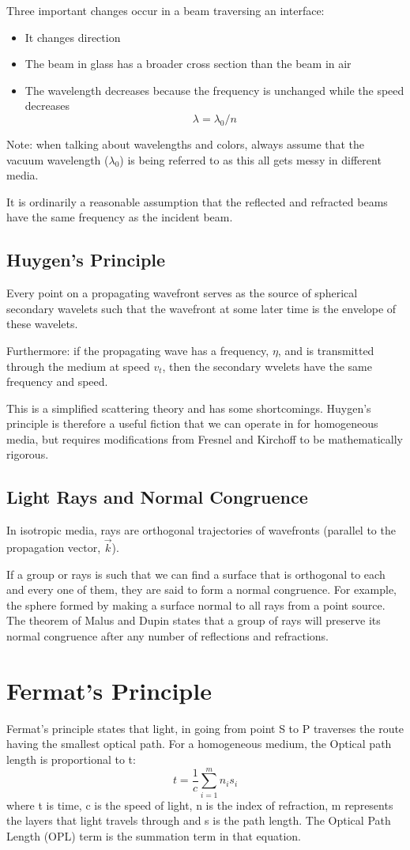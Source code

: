 \documentclass[12pt]{report}
\begin{document}
Three important changes occur in a beam traversing an interface:
\begin{itemize}
\item It changes direction
\item The beam in glass has a broader cross section than the beam in air
\item The wavelength decreases because the frequency is unchanged while the speed decreases \[\lambda = \lambda_0/n\]
\end{itemize}
Note: when talking about wavelengths and colors, always assume that the vacuum wavelength ($\lambda_0$) is being referred to as this all gets messy in different media. 

It is ordinarily a reasonable assumption that the reflected and refracted beams have the same frequency as the incident beam. 
\subsection{Huygen's Principle}
Every point on a propagating wavefront serves as the source of spherical secondary wavelets such that the wavefront at some later time is the envelope of these wavelets. 

Furthermore: if the propagating wave has a frequency, $\eta$, and is transmitted through the medium at speed $v_t$, then the secondary wvelets have the same frequency and speed. 

This is a simplified scattering theory and has some shortcomings. Huygen's principle is therefore a useful fiction that we can operate in for homogeneous media, but requires modifications from Fresnel and Kirchoff to be mathematically rigorous.
\subsection{Light Rays and Normal Congruence}
In isotropic media, rays are orthogonal trajectories of wavefronts (parallel to the propagation vector, $\vec{k}$).

If a group or rays is such that we can find a surface that is orthogonal to each and every one of them, they are said to form a normal congruence. For example, the sphere formed by making a surface normal to all rays from a point source. The theorem of Malus and Dupin states that a group of rays will preserve its normal congruence after any number of reflections and refractions. 
\section{Fermat's Principle}
Fermat's principle states that light, in going from point S to P traverses the route having the smallest optical path. For a homogeneous medium, the Optical path length is proportional to t:
\begin{equation}
t = \frac{1}{c}\sum_{i=1}^m n_is_i
\end{equation}
where t is time, c is the speed of light, n is the index of refraction, m represents the layers that light travels through and s is the path length. The Optical Path Length (OPL) term is the summation term in that equation.
\end{document}
